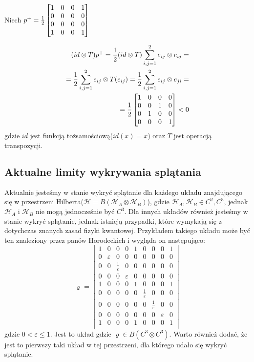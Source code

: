 \documentclass[11pt, a4paper, fleqn]{article}
\begin{document}
        Niech $p^+ = \frac{1}{2}\begin{bmatrix} 1 & 0 & 0 & 1\\ 0 & 0 & 0 & 0\\ 0 & 0 & 0 & 0\\ 1 & 0 & 0 & 1 \end{bmatrix}$

        \begin{equation}
            \begin{split}
                (id \otimes T) p^+ = \frac{1}{2}(id \otimes T) \sum_{i,j=1}^{2} e_{ij} \otimes e_{ij}=\\
                =\frac{1}{2} \sum_{i,j=1}^{2} e_{ij} \otimes T(e_{ij}) = \frac{1}{2} \sum_{i,j=1}^{2} e_{ij} \otimes e_{ji}=\\
                =\frac{1}{2} \begin{bmatrix} 1 & 0 & 0 & 0\\ 0 & 0 & 1 & 0\\ 0 & 1 & 0 & 0\\ 0 & 0 & 0 & 1 \end{bmatrix} < 0
            \end{split}
        \end{equation}
        gdzie $id$ jest funkcją tożsamościową($id(x) = x$) oraz $T$ jest operacją transpozycji.

    \subsection{Aktualne limity wykrywania splątania}
        \def\Horo{
            \begin{bmatrix}
                1 & 0 & 0 & 0 & 1 & 0 & 0 & 0 & 1\\
                0 & \varepsilon & 0 & 0 & 0 & 0 & 0 & 0 & 0\\
                0 & 0 & \frac{1}{\varepsilon} & 0 & 0 & 0 & 0 & 0 & 0\\
                0 & 0 & 0 & \varepsilon & 0 & 0 & 0 & 0 & 0\\
                1 & 0 & 0 & 0 & 1 & 0 & 0 & 0 & 1\\
                0 & 0 & 0 & 0 & 0 & \frac{1}{\varepsilon} & 0 & 0 & 0\\
                0 & 0 & 0 & 0 & 0 & 0 & \frac{1}{\varepsilon} & 0 & 0\\
                0 & 0 & 0 & 0 & 0 & 0 & 0 & \varepsilon & 0\\
                1 & 0 & 0 & 0 & 1 & 0 & 0 & 0 & 1\\
            \end{bmatrix}
        }
        Aktualnie jesteśmy w stanie wykryć splątanie dla każdego układu znajdującego się w przestrzeni Hilberta($\mathcal{H} = B(\mathcal{H}_A \otimes \mathcal{H}_B)$),
        gdzie $\mathcal{H}_A, \mathcal{H}_B \in {C^2, C^3}$, jednak $\mathcal{H}_A$ i  $\mathcal{H}_B$ nie mogą jednocześnie być $C^3$. Dla innych układów również jesteśmy w stanie wykryć splątanie,
        jednak istnieją przypadki, które wymykają się z dotychczas znanych zasad fizyki kwantowej. Przykładem takiego układu może być ten znaleziony przez panów Horodeckich i wygląda on następująco:
        \begin{equation}
            \varrho = \Horo
        \end{equation}
        gdzie $0 < \varepsilon \leq 1$.
        Jest to układ gdzie $\varrho \in B(C^3 \otimes C^3)$. Warto również dodać, że jest to pierwszy taki układ w tej przestrzeni, dla którego udało
        się wykryć splątanie.
\end{document}
